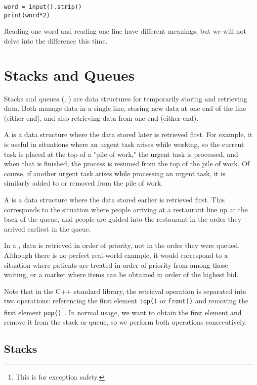 \begin{pybox}
\begin{verbatim}
word = input().strip()
print(word*2)
\end{verbatim}
\end{pybox}

Reading one word and reading one line have different meanings, but we will not delve into the difference this time.
\section{Stacks and Queues}

Stacks and queues (\pcaojbook[pp.~80--], \pccbook[pp.~31--]) are data structures for temporarily storing and retrieving data. Both manage data in a single line, storing new data at one end of the line (either end), and also retrieving data from one end (either end).

A  is a data structure where the data stored later is retrieved first. For example, it is useful in situations where an urgent task arises while working, so the current task is placed at the top of a "pile of work," the urgent task is processed, and when that is finished, the process is resumed from the top of the pile of work. Of course, if another urgent task arises while processing an urgent task, it is similarly added to or removed from the pile of work.

A  is a data structure where the data stored earlier is retrieved first. This corresponds to the situation where people arriving at a restaurant line up at the back of the queue, and people are guided into the restaurant in the order they arrived earliest in the queue.

In a , data is retrieved in order of priority, not in the order they were queued. Although there is no perfect real-world example, it would correspond to a situation where patients are treated in order of priority from among those waiting, or a market where items can be obtained in order of the highest bid.

Note that in the C++ standard library, the retrieval operation is separated into two operations: referencing the first element \texttt{top()} or \texttt{front()} and removing the first element \texttt{pop()}\footnote{This is for exception safety.}. In normal usage, we want to obtain the first element and remove it from the stack or queue, so we perform both operations consecutively.
\subsection{Stacks}\label{section:stack}


